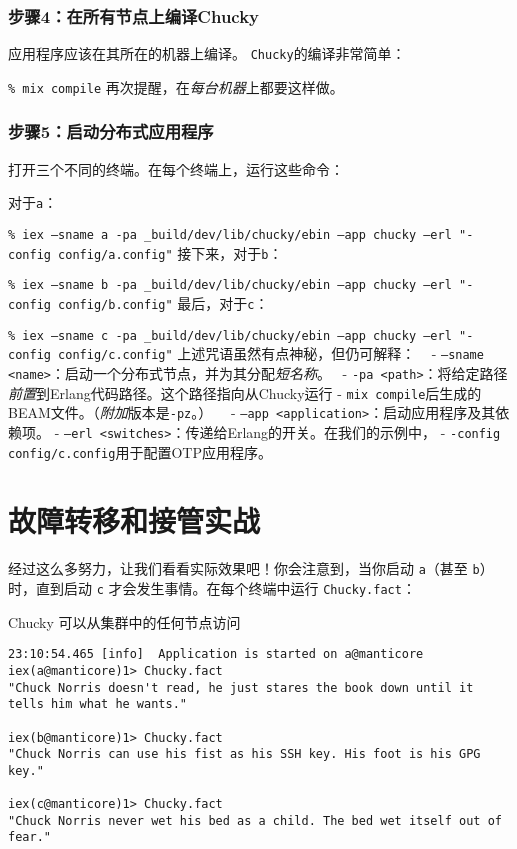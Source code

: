 \subsubsection{步骤4：在所有节点上编译Chucky}

应用程序应该在其所在的机器上编译。 \texttt{Chucky}的编译非常简单：

\texttt{\% mix compile}
再次提醒，在\emph{每台机器}上都要这样做。

\subsubsection{步骤5：启动分布式应用程序}

打开三个不同的终端。在每个终端上，运行这些命令：

对于\texttt{a}：

\texttt{\% iex --sname a -pa \_build/dev/lib/chucky/ebin --app chucky --erl "-config config/a.config"}
接下来，对于\texttt{b}：

\texttt{\% iex --sname b -pa \_build/dev/lib/chucky/ebin --app chucky --erl "-config config/b.config"}
最后，对于\texttt{c}：

\texttt{\% iex --sname c -pa \_build/dev/lib/chucky/ebin --app chucky --erl "-config config/c.config"}
上述咒语虽然有点神秘，但仍可解释： ~ -
\texttt{--sname <name>}：启动一个分布式节点，并为其分配\emph{短名称}。~
-
\texttt{-pa <path>}：将给定路径\emph{前置}到Erlang代码路径。这个路径指向从Chucky运行
-
\texttt{mix compile}后生成的BEAM文件。（\emph{附加}版本是\texttt{-pz}。）~~
-
\texttt{--app <application>}：启动应用程序及其依赖项。
-
\texttt{--erl <switches>}：传递给Erlang的开关。在我们的示例中，
- \texttt{-config config/c.config}用于配置OTP应用程序。

\section{故障转移和接管实战}

经过这么多努力，让我们看看实际效果吧！你会注意到，当你启动
\texttt{a}（甚至
\texttt{b}）时，直到启动 \texttt{c}
才会发生事情。在每个终端中运行 \texttt{Chucky.fact}：

\begin{code}{Chucky 可以从集群中的任何节点访问}

\begin{verbatim}
23:10:54.465 [info]  Application is started on a@manticore
iex(a@manticore)1> Chucky.fact
"Chuck Norris doesn't read, he just stares the book down until it tells him what he wants."

iex(b@manticore)1> Chucky.fact
"Chuck Norris can use his fist as his SSH key. His foot is his GPG key."

iex(c@manticore)1> Chucky.fact
"Chuck Norris never wet his bed as a child. The bed wet itself out of fear."
\end{verbatim}
\end{code}

